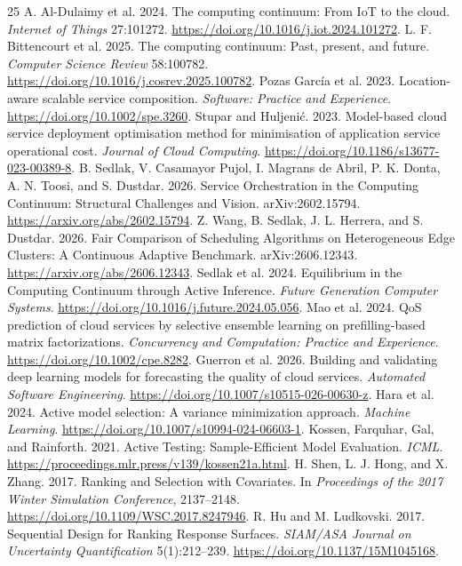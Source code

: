 \documentclass[10pt,a4paper]{article}
\begin{document}
\begin{thebibliography}{25}
 A. Al-Dulaimy et al. 2024. The computing continuum: From IoT to the cloud. \emph{Internet of Things} 27:101272. \url{https://doi.org/10.1016/j.iot.2024.101272}.
 L. F. Bittencourt et al. 2025. The computing continuum: Past, present, and future. \emph{Computer Science Review} 58:100782. \url{https://doi.org/10.1016/j.cosrev.2025.100782}.
 Pozas Garc\'ia et al. 2023. Location-aware scalable service composition. \emph{Software: Practice and Experience}. \url{https://doi.org/10.1002/spe.3260}.
 Stupar and Huljeni\'c. 2023. Model-based cloud service deployment optimisation method for minimisation of application service operational cost. \emph{Journal of Cloud Computing}. \url{https://doi.org/10.1186/s13677-023-00389-8}.
 B. Sedlak, V. Casamayor Pujol, I. Magrans de Abril, P. K. Donta, A. N. Toosi, and S. Dustdar. 2026. Service Orchestration in the Computing Continuum: Structural Challenges and Vision. arXiv:2602.15794. \url{https://arxiv.org/abs/2602.15794}.
 Z. Wang, B. Sedlak, J. L. Herrera, and S. Dustdar. 2026. Fair Comparison of Scheduling Algorithms on Heterogeneous Edge Clusters: A Continuous Adaptive Benchmark. arXiv:2606.12343. \url{https://arxiv.org/abs/2606.12343}.
 Sedlak et al. 2024. Equilibrium in the Computing Continuum through Active Inference. \emph{Future Generation Computer Systems}. \url{https://doi.org/10.1016/j.future.2024.05.056}.
 Mao et al. 2024. QoS prediction of cloud services by selective ensemble learning on prefilling-based matrix factorizations. \emph{Concurrency and Computation: Practice and Experience}. \url{https://doi.org/10.1002/cpe.8282}.
 Guerron et al. 2026. Building and validating deep learning models for forecasting the quality of cloud services. \emph{Automated Software Engineering}. \url{https://doi.org/10.1007/s10515-026-00630-z}.
 Hara et al. 2024. Active model selection: A variance minimization approach. \emph{Machine Learning}. \url{https://doi.org/10.1007/s10994-024-06603-1}.
 Kossen, Farquhar, Gal, and Rainforth. 2021. Active Testing: Sample-Efficient Model Evaluation. \emph{ICML}. \url{https://proceedings.mlr.press/v139/kossen21a.html}.
 H. Shen, L. J. Hong, and X. Zhang. 2017. Ranking and Selection with Covariates. In \emph{Proceedings of the 2017 Winter Simulation Conference}, 2137--2148. \url{https://doi.org/10.1109/WSC.2017.8247946}.
 R. Hu and M. Ludkovski. 2017. Sequential Design for Ranking Response Surfaces. \emph{SIAM/ASA Journal on Uncertainty Quantification} 5(1):212--239. \url{https://doi.org/10.1137/15M1045168}.

\end{thebibliography}
\end{document}
